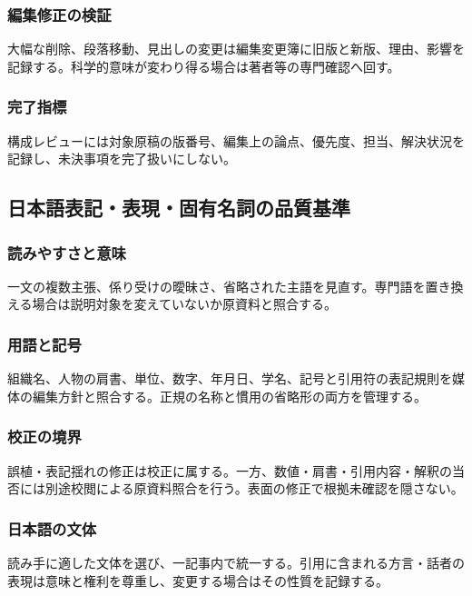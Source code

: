 \documentclass[a4paper,11pt]{article}
\begin{document}
\subsubsection{編集修正の検証}
\par 大幅な削除、段落移動、見出しの変更は編集変更簿に旧版と新版、理由、影響を記録する。科学的意味が変わり得る場合は著者等の専門確認へ回す。\par\medskip
\subsubsection{完了指標}
\par 構成レビューには対象原稿の版番号、編集上の論点、優先度、担当、解決状況を記録し、未決事項を完了扱いにしない。\par\medskip
\subsection{日本語表記・表現・固有名詞の品質基準}
\subsubsection{読みやすさと意味}
\par 一文の複数主張、係り受けの曖昧さ、省略された主語を見直す。専門語を置き換える場合は説明対象を変えていないか原資料と照合する。\par\medskip
\subsubsection{用語と記号}
\par 組織名、人物の肩書、単位、数字、年月日、学名、記号と引用符の表記規則を媒体の編集方針と照合する。正規の名称と慣用の省略形の両方を管理する。\par\medskip
\subsubsection{校正の境界}
\par 誤植・表記揺れの修正は校正に属する。一方、数値・肩書・引用内容・解釈の当否には別途校閲による原資料照合を行う。表面の修正で根拠未確認を隠さない。\par\medskip
\subsubsection{日本語の文体}
\par 読み手に適した文体を選び、一記事内で統一する。引用に含まれる方言・話者の表現は意味と権利を尊重し、変更する場合はその性質を記録する。\par\medskip
\end{document}
